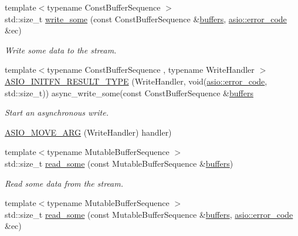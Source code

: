 \begin{DoxyCompactItemize}
{\footnotesize template$<$typename Const\+Buffer\+Sequence $>$ }\\std\+::size\+\_\+t \hyperlink{classasio_1_1ssl_1_1stream_ab7079c181a877bd4450d118a63999d83}{write\+\_\+some} (const Const\+Buffer\+Sequence \&\hyperlink{classasio_1_1ssl_1_1stream_aefa76c1cfe5178bd3e49d3fe06272133}{buffers}, \hyperlink{classasio_1_1error__code}{asio\+::error\+\_\+code} \&ec)
\begin{DoxyCompactList}\small\item\em Write some data to the stream. \end{DoxyCompactList}\item 
{\footnotesize template$<$typename Const\+Buffer\+Sequence , typename Write\+Handler $>$ }\\\hyperlink{classasio_1_1ssl_1_1stream_a2affbf5d8a2f93dbd56c3d36a56b00f3}{A\+S\+I\+O\+\_\+\+I\+N\+I\+T\+F\+N\+\_\+\+R\+E\+S\+U\+L\+T\+\_\+\+T\+Y\+P\+E} (Write\+Handler, void(\hyperlink{classasio_1_1error__code}{asio\+::error\+\_\+code}, std\+::size\+\_\+t)) async\+\_\+write\+\_\+some(const Const\+Buffer\+Sequence \&\hyperlink{classasio_1_1ssl_1_1stream_aefa76c1cfe5178bd3e49d3fe06272133}{buffers}
\begin{DoxyCompactList}\small\item\em Start an asynchronous write. \end{DoxyCompactList}\item 
\hyperlink{classasio_1_1ssl_1_1stream_a6a8710fae98f0f0147eb323172dd89aa}{A\+S\+I\+O\+\_\+\+M\+O\+V\+E\+\_\+\+A\+R\+G} (Write\+Handler) handler)
\item 
{\footnotesize template$<$typename Mutable\+Buffer\+Sequence $>$ }\\std\+::size\+\_\+t \hyperlink{classasio_1_1ssl_1_1stream_ac0c216bb02d351b2f94d96aa60a056ea}{read\+\_\+some} (const Mutable\+Buffer\+Sequence \&\hyperlink{classasio_1_1ssl_1_1stream_aefa76c1cfe5178bd3e49d3fe06272133}{buffers})
\begin{DoxyCompactList}\small\item\em Read some data from the stream. \end{DoxyCompactList}\item 
{\footnotesize template$<$typename Mutable\+Buffer\+Sequence $>$ }\\std\+::size\+\_\+t \hyperlink{classasio_1_1ssl_1_1stream_ad5419b179aba75341cc72d6be84b99d0}{read\+\_\+some} (const Mutable\+Buffer\+Sequence \&\hyperlink{classasio_1_1ssl_1_1stream_aefa76c1cfe5178bd3e49d3fe06272133}{buffers}, \hyperlink{classasio_1_1error__code}{asio\+::error\+\_\+code} \&ec)

\end{DoxyCompactItemize}
